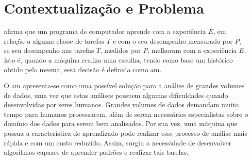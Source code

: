 \section{Contextualização e Problema}
    \label{subsec:contextualizacao-problema}
    
    
     afirma que um programa de computador aprende com a experiência $E$, em relação a alguma classe de tarefas $T$ e com o seu desempenho mensurado por $P$, se seu desempenho nas tarefas $T$, medidos por $P$, melhoram com a experiência $E$. Isto é, quando a máquina realiza uma escolha, tendo como base um histórico obtido pela mesma, essa decisão é definida como \ac{am}.

    O \ac{am} apresenta\hyp{se} como uma possível solução para a análise de grandes volumes de dados, uma vez que estas análises possuem algumas dificuldades quando desenvolvidas por seres humanos. Grandes volumes de dados demandam muito tempo para humanos processarem, além de serem necessários especialistas sobre o domínio dos dados para serem bem analisados. Por sua vez, uma máquina que possua a característica de aprendizado pode realizar esse processo de análise mais rápida e com um custo reduzido. Assim, surgiu a necessidade de desenvolver algoritmos capazes de aprender padrões e realizar tais tarefas.
    
    
    
